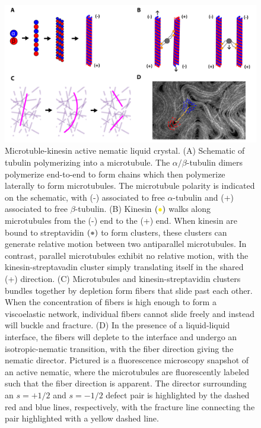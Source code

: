 \begin{figure}
  \centering
  \includegraphics{figures/C3/Ch3-Figs_ActiveBuild.png}
  \caption{Microtuble-kinesin active nematic liquid crystal.
  (A) Schematic of tubulin polymerizing into a microtubule. The $\alpha/\beta$-tubulin dimers polymerize end-to-end to form chains which then polymerize laterally to form microtubules.
  The microtubule polarity is indicated on the schematic, with (-) associated to free $\alpha$-tubulin and (+) associated to free $\beta$-tubulin.
  (B) Kinesin $({\color{yellow} \bullet})$ walks along microtubules from the (-) end to the (+) end.
  When kinesin are bound to streptavidin $({\color{gray} \bullet})$ to form clusters, these clusters can generate relative motion between two antiparallel microtubules.
  In contrast, parallel microtubules exhibit no relative motion, with the kinesin-streptavadin cluster simply translating itself in the shared (+) direction.
  (C) Microtubules and kinesin-streptavidin clusters bundles together by depletion form fibers that slide past each other.
  When the concentration of fibers is high enough to form a viscoelastic network, individual fibers cannot slide freely and instead will buckle and fracture.
  (D) In the presence of a liquid-liquid interface, the fibers will deplete to the interface and undergo an isotropic-nematic transition, with the fiber direction giving the nematic director.
  Pictured is a fluorescence microscopy snapshot of an active nematic, where the microtubules are fluorescently labeled such that the fiber direction is apparent.
  The director surrounding an $s = + 1/2$ and $s = -1/2$ defect pair is highlighted by the dashed red and blue lines, respectively, with the fracture line connecting the pair highlighted with a yellow dashed line.}\label{f:3-ActiveBuild}
\end{figure}

